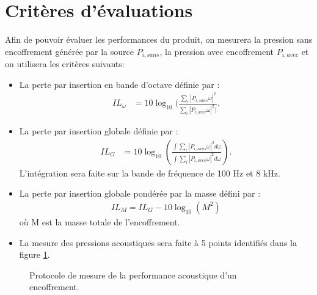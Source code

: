 \documentclass[12pt,foolscap]{report}
\begin{document}
	\section{Critères d'évaluations}
	\label{sec:critereeval}
	Afin de pouvoir évaluer les performances du produit, on mesurera la pression sans encoffrement générée par la source $P_{i,sans} $, la pression avec encoffrement $P_{i,avec} $ et on utilisera les critères suivants:\\
	\begin{itemize}
		\item La perte par insertion en bande d'octave définie par : 
		\begin{align}
		IL_{\omega} &= 10\log_{10} (\frac{ \sum_{i}|P_{i,sans} \omega|^2 }{ \sum_{i}|P_{i,avec} \omega|^2 )}\text{.}
		\label{eq:ilo}
		\end{align}
		
		\item La perte par insertion globale définie par     :
		\begin{align}
		IL_{G} &= 10\log_{10} (\frac{\int \sum_{i}|P_{i,sans} \omega|^2 d\omega}{\int \sum_{i}|P_{i,avec} \omega|^2 d\omega})\text{.}
		\label{eq:ilg}
		\end{align}
		L'intégration sera faite sur la bande de fréquence de 100 Hz et 8 
		kHz.\\
		\item La perte par insertion globale pondérée par la masse défini par : 
		\begin{align}
		I{L_M} = I{L_G} - 10{\log _{10}}({M^2})
		\label{eq:ilm}
		\end{align}
		où M est la masse totale de l'encoffrement.\\
		
		\item La mesure des pressions acoustiques sera faite à 5 points 
		identifiés dans la figure \ref{meas}. 
	\end{itemize}
	\begin{figure}
		\centering
		\caption{ Protocole de mesure de la performance acoustique d'un encoffrement.
		}
		\label{meas}
	\end{figure}
	
\end{document}
